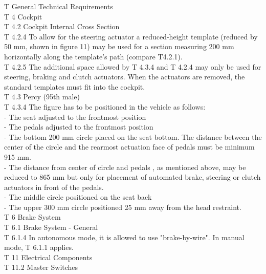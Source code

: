 \documentclass{article}
\begin{document}
T General Technical Requirements\\

T 4 Cockpit\\

T 4.2 Cockpit Internal Cross Section\\

T 4.2.4 To allow for the steering actuator a reduced-height template (reduced by 50 mm, shown in figure 11) may be used for a section measuring 200 mm horizontally along the template's path (compare T4.2.1).\\

T 4.2.5 The additional space allowed by T 4.3.4 and T 4.2.4 may only be used for steering, braking and clutch actuators. When the actuators are removed, the standard templates must fit into the cockpit.\\

T 4.3 Percy (95th male)\\

T 4.3.4 The figure has to be positioned in the vehicle as follows:\\
	- The seat adjusted to the frontmost position\\
	- The pedals adjusted to the frontmost position\\
	- The bottom 200 mm circle placed on the seat bottom. The distance between the center of the circle and the rearmost actuation face of pedals must be minimum 915 mm.\\
	- The distance from center of circle and pedals , as mentioned above, may be reduced to 865 mm but only for placement of automated brake, steering or clutch actuators in front of the pedals.\\
	- The middle circle positioned on the seat back\\
	- The upper 300 mm circle positioned 25 mm away from the head restraint.\\
	
T 6 Brake System\\

T 6.1 Brake System - General\\

T 6.1.4 In autonomous mode, it is allowed to use "brake-by-wire". In manual mode, T 6.1.1 applies.\\

T 11 Electrical Components\\

T 11.2 Master Switches\\
\end{document}
